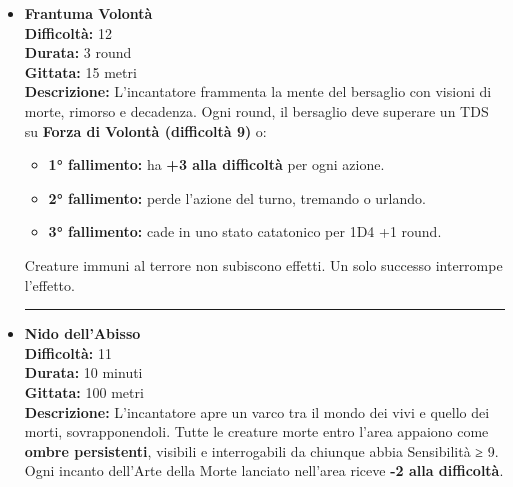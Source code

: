\documentclass[./magie.tex]{subfiles}
\begin{document}
\begin{itemize}
\vspace{0.5cm}\rule{\textwidth}{0.4pt}\vspace{1cm}

\item \textbf{Frantuma Volontà} \\
\textbf{Difficoltà:} 12 \\
\textbf{Durata:} 3 round \\
\textbf{Gittata:} 15 metri \\
\textbf{Descrizione:} L’incantatore frammenta la mente del bersaglio con visioni di morte, rimorso e decadenza. Ogni round, il bersaglio deve superare un TDS su \textbf{Forza di Volontà (difficoltà 9)} o:
\begin{itemize}
\item \textbf{1° fallimento:} ha \textbf{+3 alla difficoltà} per ogni azione.
\item \textbf{2° fallimento:} perde l’azione del turno, tremando o urlando.
\item \textbf{3° fallimento:} cade in uno stato catatonico per 1D4 +1 round.
\end{itemize}
Creature immuni al terrore non subiscono effetti. Un solo successo interrompe l’effetto.

\vspace{0.5cm}\rule{\textwidth}{0.4pt}\vspace{1cm}
\clearpage
\item \textbf{Nido dell’Abisso} \\
\textbf{Difficoltà:} 11 \\
\textbf{Durata:} 10 minuti \\
\textbf{Gittata:} 100 metri \\
\textbf{Descrizione:} L’incantatore apre un varco tra il mondo dei vivi e quello dei morti, sovrapponendoli. Tutte le creature morte entro l’area appaiono come \textbf{ombre persistenti}, visibili e interrogabili da chiunque abbia Sensibilità ≥ 9.\\
Ogni incanto dell’Arte della Morte lanciato nell’area riceve \textbf{-2 alla difficoltà}. 

\end{itemize}
\end{document}

